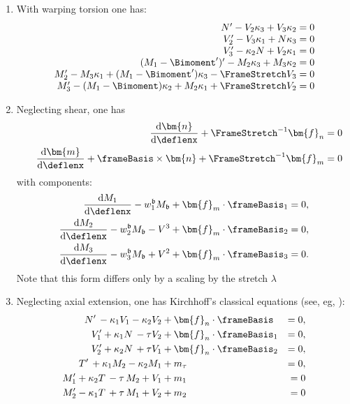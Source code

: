 \begin{enumerate}[label=(\roman*)]
\item With warping torsion one has:
    \begin{equation*}
    \begin{array}{r}
    N^{\prime}-V_2 \kappa_3+V_3 \kappa_2=0 \\
    V_2^{\prime}-V_3 \kappa_1+N \kappa_3=0 \\
    V_3^{\prime} - \kappa_2 N + V_2 \kappa_1=0 \\
    (M_1 - \Bimoment')^{\prime} - M_2 \kappa_3 + M_3 \kappa_2 = 0 \\
    M_2^{\prime}-M_3 \kappa_1 + (M_1- \Bimoment^{\prime}) \kappa_3- \FrameStretch V_3 = 0 \\
    M_3^{\prime} - (M_1 - \Bimoment) \kappa_2+M_2 \kappa_1 + \FrameStretch V_2 = 0
    \end{array}
    \end{equation*}

\item Neglecting shear, one has \parencite{cosserat1908theorie,ericksen1957exact}
  $$
  \begin{aligned}
  \frac{\mathrm{d} \bm{n}}{\mathrm{d} \deflenx}+ \FrameStretch^{-1} \bm{f}_n = 0 \\
  \quad \frac{\mathrm{d} \bm{m}}{\mathrm{d} \deflenx} + \frameBasis \times \bm{n} + \FrameStretch^{-1} \bm{f}_m = 0
  \end{aligned}
  $$
  with components:
  $$
  \begin{aligned}
  \frac{\mathrm{d} M_1}{\mathrm{d} \deflenx}-w_1^{\mathfrak{b}} M_{\mathfrak{b}}+ \bm{f}_m \cdot \frameBasis_1 &=0, \\
  \frac{\mathrm{d} M_2}{\mathrm{d} \deflenx}-w_2^{\mathfrak{b}} M_{\mathfrak{b}}-V^3+ \bm{f}_m \cdot \frameBasis_2&=0, \\
  \frac{\mathrm{d} M_3}{\mathrm{d} \deflenx}-w_3^{\mathfrak{b}} M_{\mathfrak{b}}+V^2+ \bm{f}_m \cdot \frameBasis_3&=0 .
  \end{aligned}
  $$
  Note that this form differs only by a scaling by the stretch $\lambda$

\item Neglecting axial extension, one has Kirchhoff's classical equations (see, eg, \cite{reissner1973onedimensional,dill1992kirchhoffs}):
  $$
  \begin{aligned}
  N^{\prime}\,-\kappa_1 V_1-\kappa_2 V_2&+\bm{f}_n \cdot \frameBasis\,&=0, \\
  V_1^{\prime}+\kappa_1 N\,-    \tau V_2&+\bm{f}_n \cdot \frameBasis_1&=0, \\
  V_2^{\prime}+\kappa_2 N\,+    \tau V_1&+\bm{f}_n \cdot \frameBasis_2&=0, \\
  T^{\prime}\,+\kappa_1 M_2-\kappa_2 M_1&+m_{\tau}&=0, \\
  M_1^{\prime}+\kappa_2 T\,-  \tau\, M_2+ V_1&+m_1&=0 \\
  M_2^{\prime}-\kappa_1 T\,+  \tau\, M_1+ V_2&+m_2&=0
  \end{aligned}
  $$


\end{enumerate}
